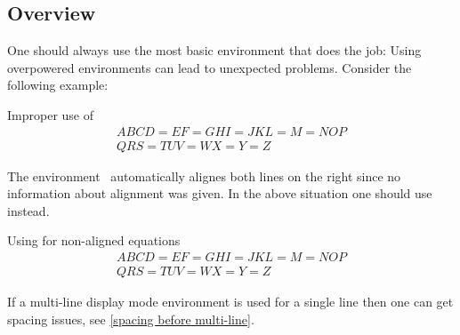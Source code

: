 \subsection{Overview}

One should always use the most basic environment that does the job:
Using overpowered environments can lead to unexpected problems.
Consider the following example:
\begin{showlatex}{Improper use of~}
\begin{align*}
  ABCD = EF = GHI = JKL = M = NOP
  \\
  QRS = TUV = WX = Y = Z
\end{align*}
\end{showlatex}
The environment~ automatically alignes both lines on the right since no information about alignment was given.
In the above situation one should use  instead.
\begin{showlatex}{Using  for non-aligned equations}
\begin{gather*}
  ABCD = EF = GHI = JKL = M = NOP
  \\
  QRS = TUV = WX = Y = Z
\end{gather*}
\end{showlatex}
If a multi-line display mode environment is used for a single line then one can get spacing issues, see \cref{spacing before multi-line}.

